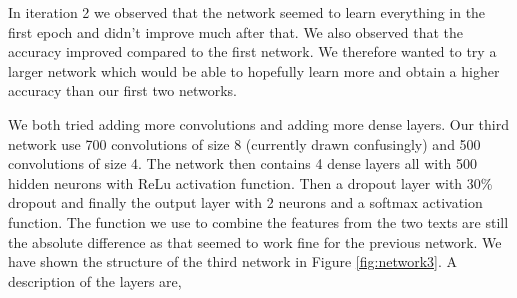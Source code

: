 In iteration 2 we observed that the network seemed to learn everything in the
first epoch and didn't improve much after that. We also observed that the
accuracy improved compared to the first network. We therefore wanted to try a
larger network which would be able to hopefully learn more and obtain a higher
accuracy than our first two networks.

We both tried adding more convolutions and adding more dense layers. Our third
network use 700 convolutions of size 8 (currently drawn confusingly) and 500
convolutions of size 4. The network then contains 4 dense layers all with 500
hidden neurons with \gls{ReLu} activation function. Then a dropout layer with
30\% dropout and finally the output layer with 2 neurons and a softmax
activation function. The function we use to combine the features from the two
texts are still the absolute difference as that seemed to work fine for the
previous network. We have shown the structure of the third network in Figure
\ref{fig:network3}. A description of the layers are,


